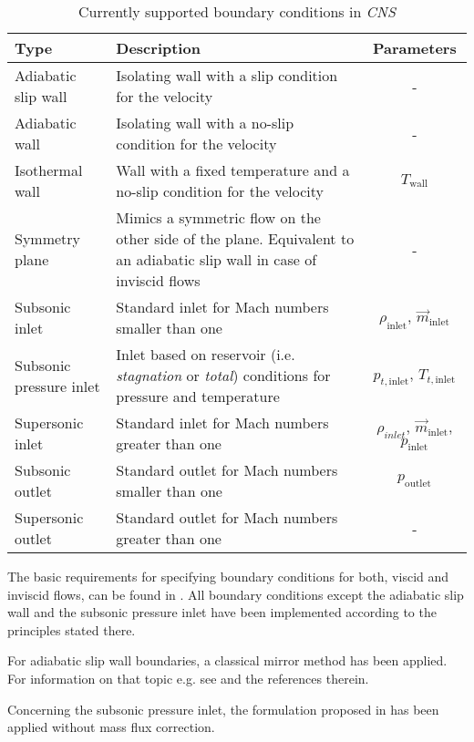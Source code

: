 \begin{table}
	\centering
	\begin{tabular}{l | p{8cm} | c}
		\hline
		Type & Description & Parameters\\
		
		\hline\hline
		Adiabatic slip wall
		& Isolating wall with a slip condition for the velocity
		& -\\
		
		\hline
		Adiabatic wall
		& Isolating wall with a no-slip condition for the velocity
		& -\\
		
		\hline
		Isothermal wall
		& Wall with a fixed temperature and a no-slip condition for the velocity
		& $T_\mathrm{wall}$\\
		
		\hline
		Symmetry plane
		& Mimics a symmetric flow on the other side of the plane. Equivalent
		to an adiabatic slip wall in case of inviscid flows
		& -\\
		
		\hline
		Subsonic inlet
		& Standard inlet for Mach numbers smaller than one
		& $\rho_\mathrm{inlet}$, $\vec{m}_\mathrm{inlet}$\\
		
		\hline
		Subsonic pressure inlet
		& Inlet based on reservoir (i.e. \emph{stagnation} or \emph{total})
		conditions for pressure and temperature
		& $p_{t,\mathrm{inlet}}$, $T_{t,\mathrm{inlet}}$\\
		
		\hline
		Supersonic inlet
		& Standard inlet for Mach numbers greater than one
		& $\rho_{inlet}$, $\vec{m}_\mathrm{inlet}$, $p_\mathrm{inlet}$\\
		
		\hline
		Subsonic outlet
		& Standard outlet for Mach numbers smaller than one
		& $p_\mathrm{outlet}$\\
		
		\hline
		Supersonic outlet
		& Standard outlet for Mach numbers greater than one
		& -\\
		
		\hline
	\end{tabular}
	
	\caption{Currently supported boundary conditions in \emph{CNS}}
	\label{fig:boundary_conditions}
\end{table}

The basic requirements for specifying boundary conditions for both, viscid and 
inviscid flows, can be found in \cite{PoinsotLelef1992}. All boundary conditions 
except the adiabatic slip wall and the subsonic pressure inlet have been
implemented according to the principles stated there.

For adiabatic slip wall boundaries, a classical mirror method has been applied.
For information on that topic e.g. see \cite{VegtVen2002} and the references
therein.

Concerning the subsonic pressure inlet, the formulation proposed 
in \cite{FerzigerPeric2001} has been applied without mass flux correction.
